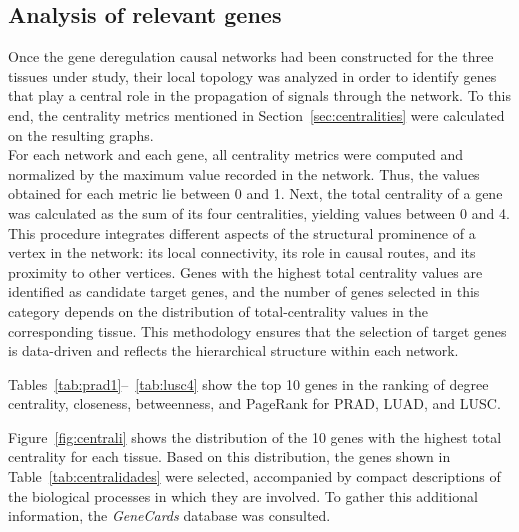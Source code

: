 \documentclass[12pt,a4paper]{report}
\begin{document}
\subsection{Analysis of relevant genes}
Once the gene deregulation causal networks had been constructed for the three tissues under study, their local topology was analyzed in order to identify genes that play a central role in the propagation of signals through the network. To this end, the centrality metrics mentioned in Section~\ref{sec:centralities} were calculated on the resulting graphs.
\\
For each network and each gene, all centrality metrics were computed and normalized by the maximum value recorded in the network. Thus, the values obtained for each metric lie between 0 and 1. Next, the total centrality of a gene was calculated as the sum of its four centralities, yielding values between 0 and 4. This procedure integrates different aspects of the structural prominence of a vertex in the network: its local connectivity, its role in causal routes, and its proximity to other vertices. Genes with the highest total centrality values are identified as candidate target genes, and the number of genes selected in this category depends on the distribution of total-centrality values in the corresponding tissue.
This methodology ensures that the selection of target genes is data-driven and reflects the hierarchical structure within each network.

Tables~\ref{tab:prad1}--~\ref{tab:lusc4} show the top 10 genes in the ranking of degree centrality, closeness, betweenness, and PageRank for PRAD, LUAD, and LUSC.

Figure~\ref{fig:centrali} shows the distribution of the 10 genes with the highest total centrality for each tissue. Based on this distribution, the genes shown in Table~\ref{tab:centralidades} were selected, accompanied by compact descriptions of the biological processes in which they are involved. To gather this additional information, the \textit{GeneCards} database was consulted\cite{GeneCards}.
\end{document}
